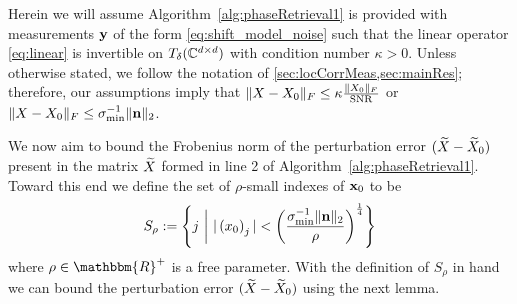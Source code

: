 Herein we will assume Algorithm~\ref{alg:phaseRetrieval1} is provided with measurements $\mathbf y$ of the form \eqref{eq:shift_model_noise} such that the linear operator \eqref{eq:linear} is invertible on $T_{\delta}(\mathbb{C}^{d \times d})$ with condition number $\kappa > 0$.  Unless otherwise stated, we follow the notation of \cref{sec:locCorrMeas,sec:mainRes}; therefore, our assumptions imply that $\lVert X - X_0\rVert_F \le \kappa \frac{\lVert X_0\rVert_F}{\operatorname{SNR}}$ or $\lVert X - X_0\rVert_F \le \sigma_{\min}^{-1} \lVert\mathbf n\rVert_2$.

We now aim to bound the Frobenius norm of the perturbation error $(\widetilde{X} - \widetilde{X}_0)$ present in the matrix $\widetilde{X}$ formed in line 2 of Algorithm~\ref{alg:phaseRetrieval1}.
Toward this end we define the set of $\rho$-small indexes of $\mathbf x_0$ to be 
\begin{equation}
S_\rho := \left\{ j~\bigg|~ | \left( x_0 \right)_j | < \left(\frac{\sigma_{\min}^{-1} \| \mathbf n \|_2}{\rho} \right)^{\frac{1}{4}} \right\}
\label{equ:SrhoDef}
\end{equation}
where $\rho \in \mathbbm{R}^+$ is a free parameter.  
%
%
With the definition of $S_\rho$ in hand we can bound the perturbation error $(\widetilde{X} - \widetilde{X}_0)$ using the next lemma.
